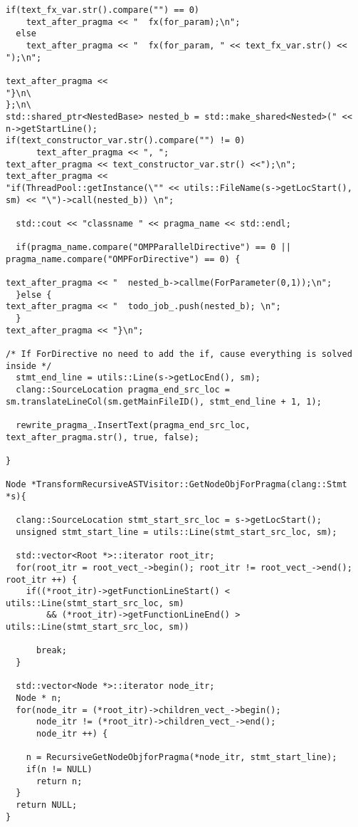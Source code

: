 \documentclass[a4paper,11pt,twoside]{book}
\begin{document}
\begin{lstlisting}[language=CCC, caption=driver/program.cpp]
  if(text_fx_var.str().compare("") == 0)
    text_after_pragma << "  fx(for_param);\n";
  else
    text_after_pragma << "  fx(for_param, " << text_fx_var.str() << ");\n";

text_after_pragma << 
"}\n\
};\n\
std::shared_ptr<NestedBase> nested_b = std::make_shared<Nested>(" << n->getStartLine();
if(text_constructor_var.str().compare("") != 0)
      text_after_pragma << ", ";    
text_after_pragma << text_constructor_var.str() <<");\n";
text_after_pragma << 
"if(ThreadPool::getInstance(\"" << utils::FileName(s->getLocStart(), sm) << "\")->call(nested_b)) \n";
    
  std::cout << "classname " << pragma_name << std::endl;

  if(pragma_name.compare("OMPParallelDirective") == 0 || pragma_name.compare("OMPForDirective") == 0) {

text_after_pragma << "  nested_b->callme(ForParameter(0,1));\n";
  }else {
text_after_pragma << "  todo_job_.push(nested_b); \n";
  }
text_after_pragma << "}\n";

/* If ForDirective no need to add the if, cause everything is solved inside */
  stmt_end_line = utils::Line(s->getLocEnd(), sm);
  clang::SourceLocation pragma_end_src_loc = sm.translateLineCol(sm.getMainFileID(), stmt_end_line + 1, 1);

  rewrite_pragma_.InsertText(pragma_end_src_loc, text_after_pragma.str(), true, false);

}

Node *TransformRecursiveASTVisitor::GetNodeObjForPragma(clang::Stmt *s){

  clang::SourceLocation stmt_start_src_loc = s->getLocStart();
  unsigned stmt_start_line = utils::Line(stmt_start_src_loc, sm);

  std::vector<Root *>::iterator root_itr;
  for(root_itr = root_vect_->begin(); root_itr != root_vect_->end(); root_itr ++) {
    if((*root_itr)->getFunctionLineStart() < utils::Line(stmt_start_src_loc, sm) 
        && (*root_itr)->getFunctionLineEnd() > utils::Line(stmt_start_src_loc, sm))
      
      break;
  }
  
  std::vector<Node *>::iterator node_itr;
  Node * n;
  for(node_itr = (*root_itr)->children_vect_->begin(); 
      node_itr != (*root_itr)->children_vect_->end(); 
      node_itr ++) {
    
    n = RecursiveGetNodeObjforPragma(*node_itr, stmt_start_line);
    if(n != NULL)
      return n;
  }
  return NULL;
}


\end{lstlisting}
\end{document}
